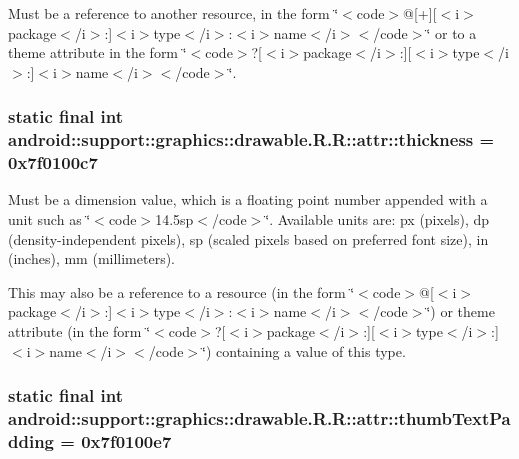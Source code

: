 Must be a reference to another resource, in the form \char`\"{}$<$code$>$@\mbox{[}+\mbox{]}\mbox{[}$<$i$>$package$<$/i$>$:\mbox{]}$<$i$>$type$<$/i$>$:$<$i$>$name$<$/i$>$$<$/code$>$\char`\"{} or to a theme attribute in the form \char`\"{}$<$code$>$?\mbox{[}$<$i$>$package$<$/i$>$:\mbox{]}\mbox{[}$<$i$>$type$<$/i$>$:\mbox{]}$<$i$>$name$<$/i$>$$<$/code$>$\char`\"{}. \hypertarget{classandroid_1_1support_1_1graphics_1_1drawable_1_1_r_1_1attr_1b7d60d6df735f517e8a2da17d150b12}{
\subsubsection[{thickness}]{\setlength{\rightskip}{0pt plus 5cm}static final int android::support::graphics::drawable.R.R::attr::thickness = 0x7f0100c7}}
\label{classandroid_1_1support_1_1graphics_1_1drawable_1_1_r_1_1attr_1b7d60d6df735f517e8a2da17d150b12}


Must be a dimension value, which is a floating point number appended with a unit such as \char`\"{}$<$code$>$14.5sp$<$/code$>$\char`\"{}. Available units are: px (pixels), dp (density-independent pixels), sp (scaled pixels based on preferred font size), in (inches), mm (millimeters). 

This may also be a reference to a resource (in the form \char`\"{}$<$code$>$@\mbox{[}$<$i$>$package$<$/i$>$:\mbox{]}$<$i$>$type$<$/i$>$:$<$i$>$name$<$/i$>$$<$/code$>$\char`\"{}) or theme attribute (in the form \char`\"{}$<$code$>$?\mbox{[}$<$i$>$package$<$/i$>$:\mbox{]}\mbox{[}$<$i$>$type$<$/i$>$:\mbox{]}$<$i$>$name$<$/i$>$$<$/code$>$\char`\"{}) containing a value of this type. \hypertarget{classandroid_1_1support_1_1graphics_1_1drawable_1_1_r_1_1attr_bb3875fe5314e704f6434288312c1d15}{
\subsubsection[{thumbTextPadding}]{\setlength{\rightskip}{0pt plus 5cm}static final int android::support::graphics::drawable.R.R::attr::thumbTextPadding = 0x7f0100e7}}
\label{classandroid_1_1support_1_1graphics_1_1drawable_1_1_r_1_1attr_bb3875fe5314e704f6434288312c1d15}


